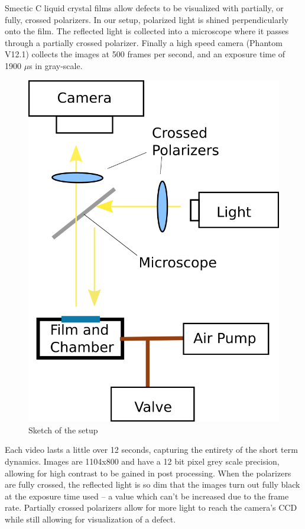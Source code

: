 \documentclass[prl,reprint,showpacs,floatfix,nofootinbib]{revtex4-1}
\begin{document}

Smectic C liquid crystal films allow defects to be visualized with partially, or fully, crossed polarizers. In our setup, polarized light is shined perpendicularly onto the film. The reflected light is collected into a microscope where it passes through a partially crossed polarizer. Finally a high speed camera (Phantom V12.1) collects the images at 500 frames per second, and an exposure time of 1900 $\mu$s in gray-scale.

\begin{figure}
  \includegraphics[width=\linewidth]{setup_sketch.png}
  \caption{Sketch of the setup}
  \label{fig:Setup Sketch}
\end{figure}


Each video lasts a little over 12 seconds, capturing the entirety of the short term dynamics. Images are 1104x800  and have a 12 bit pixel grey scale precision, allowing for high contrast to be gained in post processing. When the polarizers are fully crossed, the reflected light is so dim that the images turn out fully black at the exposure time used -- a value which can't be increased due to the frame rate. Partially crossed polarizers allow for more light to reach the camera's CCD while still allowing for visualization of a defect.
\end{document}
